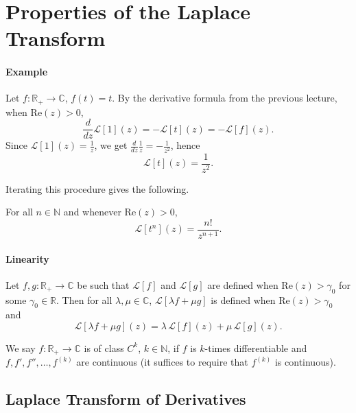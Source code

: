 
\newpage


\section{Properties of the Laplace Transform}

\paragraph{Example}
\begin{example}
Let $f : \mathbb{R}_+ \to \mathbb{C}$, $f(t) = t$. By the derivative formula from the previous lecture, when $\mathrm{Re}(z) > 0$,
\[
\frac{d}{dz}\mathcal{L}[1](z) = -\mathcal{L}[t](z) = -\mathcal{L}[f](z).
\]
Since $\mathcal{L}[1](z) = \tfrac{1}{z}$, we get $\frac{d}{dz}\tfrac{1}{z} = -\tfrac{1}{z^2}$, hence
\[
\boxed{\mathcal{L}[t](z) = \frac{1}{z^2}.}
\]
\end{example}

Iterating this procedure gives the following.

\begin{theorem}
For all $n \in \mathbb{N}$ and whenever $\mathrm{Re}(z) > 0$,
\[
\boxed{\mathcal{L}[t^n](z) = \frac{n!}{z^{n+1}}.}
\]
\end{theorem}

\paragraph{Linearity}
Let $f, g : \mathbb{R}_+ \to \mathbb{C}$ be such that $\mathcal{L}[f]$ and $\mathcal{L}[g]$ are defined when $\mathrm{Re}(z) > \gamma_0$ for some $\gamma_0 \in \mathbb{R}$. Then for all $\lambda, \mu \in \mathbb{C}$, $\mathcal{L}[\lambda f + \mu g]$ is defined when $\mathrm{Re}(z) > \gamma_0$ and
\[
\boxed{\mathcal{L}[\lambda f + \mu g](z) = \lambda\,\mathcal{L}[f](z) + \mu\,\mathcal{L}[g](z).}
\]

\begin{remark}[Nomenclature]
We say $f : \mathbb{R}_+ \to \mathbb{C}$ is of class $C^k$, $k \in \mathbb{N}$, if $f$ is $k$-times differentiable and $f, f', f'', \dots, f^{(k)}$ are continuous (it suffices to require that $f^{(k)}$ is continuous).
\end{remark}

\subsection{Laplace Transform of Derivatives}

